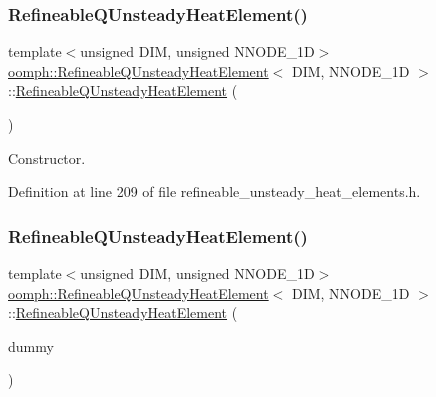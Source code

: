 \subsubsection{\texorpdfstring{Refineable\+Q\+Unsteady\+Heat\+Element()}{RefineableQUnsteadyHeatElement()}\hspace{0.1cm}{\footnotesize\ttfamily [1/2]}}
{\footnotesize\ttfamily template$<$unsigned D\+IM, unsigned N\+N\+O\+D\+E\+\_\+1D$>$ \\
\hyperlink{classoomph_1_1RefineableQUnsteadyHeatElement}{oomph\+::\+Refineable\+Q\+Unsteady\+Heat\+Element}$<$ D\+IM, N\+N\+O\+D\+E\+\_\+1D $>$\+::\hyperlink{classoomph_1_1RefineableQUnsteadyHeatElement}{Refineable\+Q\+Unsteady\+Heat\+Element} (\begin{DoxyParamCaption}{ }\end{DoxyParamCaption})\hspace{0.3cm}{\ttfamily [inline]}}



Constructor. 



Definition at line 209 of file refineable\+\_\+unsteady\+\_\+heat\+\_\+elements.\+h.

\mbox{\label{classoomph_1_1RefineableQUnsteadyHeatElement_a7a49d849293f74b46dc261c89c6234b4}} 
\subsubsection{\texorpdfstring{Refineable\+Q\+Unsteady\+Heat\+Element()}{RefineableQUnsteadyHeatElement()}\hspace{0.1cm}{\footnotesize\ttfamily [2/2]}}
{\footnotesize\ttfamily template$<$unsigned D\+IM, unsigned N\+N\+O\+D\+E\+\_\+1D$>$ \\
\hyperlink{classoomph_1_1RefineableQUnsteadyHeatElement}{oomph\+::\+Refineable\+Q\+Unsteady\+Heat\+Element}$<$ D\+IM, N\+N\+O\+D\+E\+\_\+1D $>$\+::\hyperlink{classoomph_1_1RefineableQUnsteadyHeatElement}{Refineable\+Q\+Unsteady\+Heat\+Element} (\begin{DoxyParamCaption}\item[{const \hyperlink{classoomph_1_1RefineableQUnsteadyHeatElement}{Refineable\+Q\+Unsteady\+Heat\+Element}$<$ D\+IM, N\+N\+O\+D\+E\+\_\+1D $>$ \&}]{dummy }\end{DoxyParamCaption})\hspace{0.3cm}{\ttfamily [inline]}}



